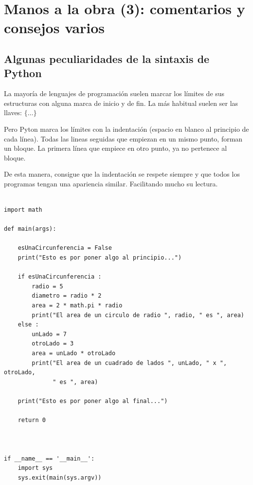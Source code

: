 \documentclass[spanish,12pt,a4paper,final,oneside]{book}
\begin{document}
\section{Manos a la obra (3): comentarios y consejos varios}\label{manos_a_la_obra_3}

\subsection{Algunas peculiaridades de la sintaxis de Python}

La mayoría de lenguajes de programación suelen marcar los límites de sus estructuras con alguna marca de inicio y de fin. La más habitual suelen ser las llaves:  $\{ \ldots \}$

Pero Pyton marca los límites con la indentación (espacio en blanco al principio de cada línea). Todas las lineas seguidas que empiezan en un mismo punto, forman un bloque. La primera línea que empiece en otro punto, ya no pertenece al bloque.

De esta manera, consigue que la indentación se respete siempre y que todos los programas tengan una apariencia similar. Facilitando mucho su lectura.

\begin{lstlisting}[frame=single, caption=lenguaje Python : indentación correcta]

import math

def main(args):
    
    esUnaCircunferencia = False
    print("Esto es por poner algo al principio...")
        
    if esUnaCircunferencia :
        radio = 5
        diametro = radio * 2
        area = 2 * math.pi * radio
        print("El area de un circulo de radio ", radio, " es ", area)
    else :
        unLado = 7
        otroLado = 3
        area = unLado * otroLado
        print("El area de un cuadrado de lados ", unLado, " x ", otroLado, 
              " es ", area)
              
    print("Esto es por poner algo al final...")
        
    return 0



if __name__ == '__main__':
    import sys
    sys.exit(main(sys.argv))

\end{lstlisting}
\end{document}
